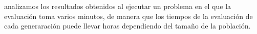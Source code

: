 \label{resultados-facerecognition}

analizamos los resultados obtenidos al ejecutar un problema en el que la evaluación toma varios minutos, de manera que los tiempos de la evaluación de cada generaraci\'on puede llevar horas dependiendo del tamaño de la población.